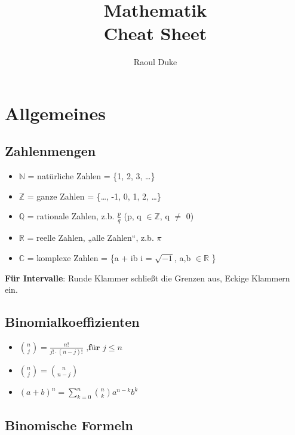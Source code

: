 \documentclass[german]{latex4ei/latex4ei_sheet}
\title{Mathematik \\ Cheat Sheet}
\author{Raoul Duke}					%
\begin{document}
\maketitle   %

\section{Allgemeines}

\begin{sectionbox}
\subsection{Zahlenmengen}\label{zahlenmengen}

\begin{itemize}
\item
  $\mathbb{N}$ = natürliche Zahlen = \{1, 2, 3, \ldots{}\}
\item
  $\mathbb{Z}$ = ganze Zahlen = \{\ldots{}, -1, 0, 1, 2, \ldots{}\}
\item
  $\mathbb{Q}$ = rationale Zahlen, z.b. \(\frac{p}{q}\) (p, q \(\in \mathbb{Z}\), q \(\neq\) 0)
\item
  $\mathbb{R}$ = reelle Zahlen, „alle Zahlen``, z.b. \(\pi\)
\item
  $\mathbb{C}$ = komplexe Zahlen = \{a + ib \textbar{} i = \(\sqrt{- 1}\), a,b \(\in \mathbb{R}\) \}
\end{itemize}

\textbf{Für Intervalle}:
Runde Klammer schließt die Grenzen aus, Eckige Klammern ein. 

\subsection{Binomialkoeffizienten}
\begin{itemize}
    \item ${n \choose j} = \frac{n!}{j!\cdot (n-j)!} \textbf{ ,für }j\leq n$
    \item  ${n \choose j} = {n \choose n-j}$
    \item  $(a+b)^n = \sum\limits_{k=0}^n {n\choose k} a^{n-k} b^k $
\end{itemize} 



\subsection{Binomische Formeln}\label{binomische-formeln}


\end{sectionbox}
\end{document}
